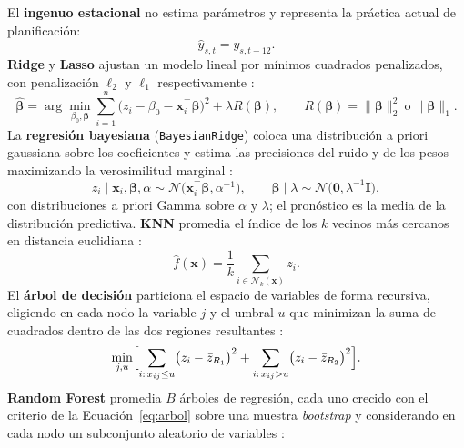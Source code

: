 \documentclass[pdflatex,sn-mathphys-num]{sn-jnl}
\begin{document}
El \textbf{ingenuo estacional} \cite{hyndman2021} no estima parámetros y representa la práctica actual de planificación:
\begin{equation}
\hat{y}_{s,t}=y_{s,t-12}.
\label{eq:naive}
\end{equation}
\textbf{Ridge} y \textbf{Lasso} ajustan un modelo lineal por mínimos cuadrados penalizados, con penalización $\ell_2$ y $\ell_1$ respectivamente \cite{hoerl1970,tibshirani1996}:
\begin{equation}
\hat{\boldsymbol{\beta}}=\arg\min_{\beta_0,\boldsymbol{\beta}}\sum_{i=1}^{n}\bigl(z_i-\beta_0-\mathbf{x}_i^{\top}\boldsymbol{\beta}\bigr)^2+\lambda R(\boldsymbol{\beta}),\qquad R(\boldsymbol{\beta})=\lVert\boldsymbol{\beta}\rVert_2^2\ \text{o}\ \lVert\boldsymbol{\beta}\rVert_1.
\label{eq:ridge}
\end{equation}
La \textbf{regresión bayesiana} (\texttt{BayesianRidge}) coloca una distribución a priori gaussiana sobre los coeficientes y estima las precisiones del ruido y de los pesos maximizando la verosimilitud marginal \cite{mackay1992}:
\begin{equation}
z_i\mid\mathbf{x}_i,\boldsymbol{\beta},\alpha\sim\mathcal{N}\bigl(\mathbf{x}_i^{\top}\boldsymbol{\beta},\alpha^{-1}\bigr),\qquad \boldsymbol{\beta}\mid\lambda\sim\mathcal{N}\bigl(\mathbf{0},\lambda^{-1}\mathbf{I}\bigr),
\label{eq:bayes}
\end{equation}
con distribuciones a priori Gamma sobre $\alpha$ y $\lambda$; el pronóstico es la media de la distribución predictiva. \textbf{KNN} promedia el índice de los $k$ vecinos más cercanos en distancia euclidiana \cite{cover1967}:
\begin{equation}
\hat{f}(\mathbf{x})=\frac{1}{k}\sum_{i\in\mathcal{N}_k(\mathbf{x})}z_i.
\label{eq:knn}
\end{equation}
El \textbf{árbol de decisión} particiona el espacio de variables de forma recursiva, eligiendo en cada nodo la variable $j$ y el umbral $u$ que minimizan la suma de cuadrados dentro de las dos regiones resultantes \cite{breiman1984}:
\begin{equation}
\min_{j,u}\Bigl[\sum_{i:\,x_{ij}\le u}\bigl(z_i-\bar{z}_{R_1}\bigr)^2+\sum_{i:\,x_{ij}>u}\bigl(z_i-\bar{z}_{R_2}\bigr)^2\Bigr].
\label{eq:arbol}
\end{equation}
\textbf{Random Forest} promedia $B$ árboles de regresión, cada uno crecido con el criterio de la Ecuación~\eqref{eq:arbol} sobre una muestra \emph{bootstrap} y considerando en cada nodo un subconjunto aleatorio de variables \cite{breiman2001}:
\end{document}
